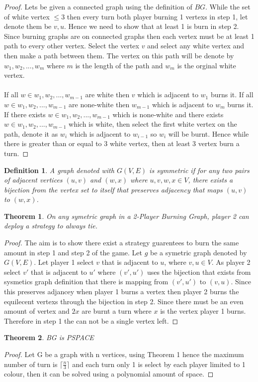 \documentclass{article}
\newtheorem{theorem}{Theorem}
\newtheorem{definition}{Definition}
\begin{document}
\begin{proof}
Lets be given a connected graph using the definition of \(BG\). While the set of white vertex $\le 3$ 
then every turn both player burning 1 vertexs in step 1, let denote them be $v, u$. Hence we need to show that at least 1 is burn in step 2.
Since burning graphs are on connected graphs then each vertex must be at least 1 path to every other vertex.
Select the vertex $v$ and select any white vertex and then make a path between them. The vertex on this path will be denote by ${w_1, w_2,..., w_m}$
where $m$ is the length of the path and $w_m$ is the orginal white vertex.\\\\
If all $w \in {w_1, w_2,..., w_{m-1}}$ are white then $v$ which is adjacent to $w_1$ burns it.
If all $w \in {w_1, w_2,..., w_{m-1}}$ are none-white then $w_{m-1}$ which is adjacent to $w_m$ burns it.
If there exists $w \in {w_1, w_2,..., w_{m-1}}$ which is none-white and there exists $w \in {w_1, w_2,..., w_{m-1}}$ which is white,
then select the first white vertex on the path, denote it as $w_i$ which is adjacent to $w_{i-1}$ so $w_i$ will be burnt.
Hence while there is greater than or equal to 3 white vertex, then at least 3 vertex burn a turn.
\end{proof}

\begin{definition}
A graph denoted with $G(V,E)$ is symmetric if for any two pairs of adjacent vertices $(u,v)$ and $(w,x)$ where $u,v,w,x \in V$, 
there exists a bijection from the vertex set to itself that preserves adjacency that maps $(u,v)$ to  $(w,x)$.
\end{definition}

\begin{theorem}
On any symetric graph in a 2-Player Burning Graph, player 2 can deploy a strategy to always tie.
\end{theorem}

\begin{proof}
The aim is to show there exist a strategy guarentees to burn the same amount in step 1 and step 2 of the game.
Let $g$ be a symetric graph denoted by $G(V,E)$. Let player 1 select $v$ that is adjacent to $u$, where $v,u \in V$. 
As player 2 select $v'$ that is adjacent to $u'$ where $(v',u')$ uses the bijection that exists from sysmetics graph definition
that there is mapping from $(v',u')$ to $(v,u)$. Since this preserves adjancey when player 1 burns a vertex then player 2 burns the equilecent vertexs through the bijection in step 2.
Since there must be an even amount of vertex and $2x$ are burnt a turn where $x$ is the vertex player 1 burns.
Therefore in step 1 the can not be a single vertex left.
\end{proof}

\begin{theorem}
BG is PSPACE
\end{theorem}

\begin{proof}
Let G be a graph with n vertices, using Theorem 1 hence the maximum number of turn is $\lceil \frac{n}{3} \rceil$ and each turn only 1 is select by each player limited to 1 colour, then it can be solved using a polynomial amount of space.
\end{proof}
\end{document}
